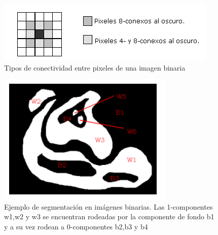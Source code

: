 	\begin{figure}[tpb]
\begin{center}
  \includegraphics[scale=0.6]{figuras/48conexos.png}
\end{center}
  \caption{\small Tipos de conectividad entre pixeles de una imagen binaria}
  \label{fig:conectividad}
\end{figure}

\begin{figure}[tpb]
\begin{center}
  \includegraphics[scale=0.6]{figuras/zonas-contours.png}
\end{center}
  \caption{\small Ejemplo de segmentación en imágenes binarias. Las 1-componentes w1,w2 y w3 se encuentran rodeadas por la componente de fondo b1 y a su vez
  rodean a 0-componentes b2,b3 y b4 }
  \label{fig:contours}
\end{figure}
	
	
